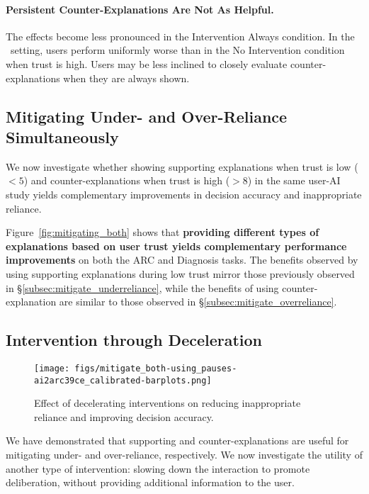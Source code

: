 \paragraph{Persistent Counter-Explanations Are Not As Helpful.} The effects become less pronounced in the Intervention Always condition. 
In the \arco\ setting, users perform uniformly worse than in the No Intervention condition when trust is high. 
Users may be less inclined to closely evaluate counter-explanations when they are always shown.


\subsection{Mitigating Under- and Over-Reliance Simultaneously}
\label{subsec:mitigate_both}

We now investigate whether showing supporting explanations when trust is low ($<5$) and counter-explanations when trust is high ($>8$) in the same user-AI study yields complementary improvements in decision accuracy and inappropriate reliance. 

Figure~\ref{fig:mitigating_both} shows that \textbf{providing different types of explanations based on user trust yields complementary performance improvements} on both the ARC and Diagnosis tasks. 
The benefits observed by using supporting explanations during low trust mirror those previously observed in \S\ref{subsec:mitigate_underreliance}, while the benefits of using counter-explanation are similar to those observed in \S\ref{subsec:mitigate_overreliance}.

\subsection{Intervention through Deceleration}
\label{subsec:deceleration}

\begin{figure*}[t]
    \centering
    \texttt{[image: figs/mitigate\_both-using\_pauses-ai2arc39ce\_calibrated-barplots.png]}
    \caption{Effect of decelerating interventions on reducing inappropriate reliance and improving decision accuracy.}
    \label{fig:pause_results}
\end{figure*}

We have demonstrated that supporting and counter-explanations are useful for mitigating under- and over-reliance, respectively. 
We now investigate the utility of another type of intervention: slowing down the interaction to promote deliberation, without providing additional information to the user. 

